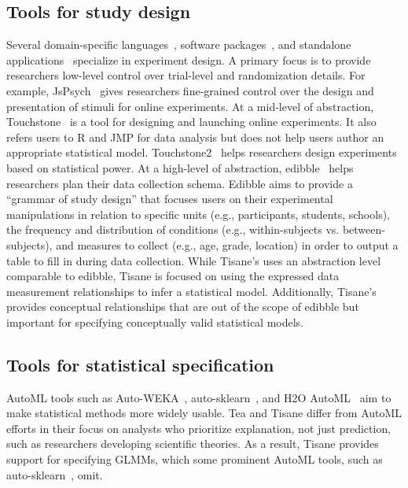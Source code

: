 \subsection{Tools for study design}
Several domain-specific languages~\cite{gosset,bakshy2014planout}, software
packages~\cite{edibble,blair2019declaring}, and standalone
applications~\cite{mackay2007touchstone,eiselmayer2019touchstone2} specialize in
experiment design. A primary focus is to provide researchers low-level control
over trial-level and randomization details. For example,
JsPsych~\cite{deLeeuw2015jspsych} gives researchers fine-grained control over
the design and presentation of stimuli for online experiments. At a mid-level of
abstraction, Touchstone~\cite{mackay2007touchstone} is a %
tool for designing and launching online experiments. It also refers users to R
and JMP for data analysis but does not help users author an appropriate
statistical model. Touchstone2~\cite{eiselmayer2019touchstone2} helps
researchers design experiments based on statistical power. At a high-level of
abstraction, edibble~\cite{edibble} helps researchers plan their data collection
schema. Edibble aims to provide a ``grammar of study design'' that focuses users
on their experimental manipulations in relation to specific units (e.g.,
participants, students, schools), the frequency and distribution of conditions
(e.g., within-subjects vs. between-subjects), and measures to collect (e.g.,
age, grade, location) in order to output a table to fill in during data
collection. While Tisane's \SDSLlong uses an abstraction level comparable to
edibble, Tisane is focused on using the expressed data measurement relationships
to infer a statistical model. Additionally, Tisane's \SDSL provides conceptual
relationships that are out of the scope of edibble but important for specifying
conceptually valid statistical models.

\subsection{Tools for statistical specification}
AutoML tools such as
Auto-WEKA~\cite{autoweka}, auto-sklearn~\cite{autosklearn}, and H2O
AutoML~\cite{H2OAutoML20} aim to make statistical methods more widely usable.
Tea and Tisane differ from AutoML efforts in their focus on analysts who
prioritize explanation, not just prediction, such as researchers developing
scientific theories. As a result, Tisane provides support for specifying GLMMs,
which some prominent AutoML tools, such as auto-sklearn~\cite{autosklearn},
omit. 

